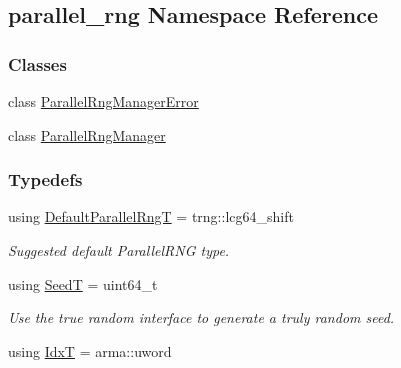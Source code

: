 \hypertarget{namespaceparallel__rng}{\subsection{parallel\-\_\-rng Namespace Reference}
\label{namespaceparallel__rng}
}
\subsubsection*{Classes}
\begin{DoxyCompactItemize}
\item 
class \hyperlink{classparallel__rng_1_1ParallelRngManagerError}{Parallel\-Rng\-Manager\-Error}
\item 
class \hyperlink{classparallel__rng_1_1ParallelRngManager}{Parallel\-Rng\-Manager}
\end{DoxyCompactItemize}
\subsubsection*{Typedefs}
\begin{DoxyCompactItemize}
\item 
using \hyperlink{namespaceparallel__rng_a4cb66b089d51a2a89cf6deac41c9b15f}{Default\-Parallel\-Rng\-T} = trng\-::lcg64\-\_\-shift
\begin{DoxyCompactList}\small\item\em Suggested default Parallel\-R\-N\-G type. \end{DoxyCompactList}\item 
using \hyperlink{namespaceparallel__rng_a462b8721a1aabe3b86582e864640c707}{Seed\-T} = uint64\-\_\-t
\begin{DoxyCompactList}\small\item\em Use the true random interface to generate a truly random seed. \end{DoxyCompactList}\item 
using \hyperlink{namespaceparallel__rng_aa22fa3e339aee5927780aac099dfc6f3}{Idx\-T} = arma\-::uword
\end{DoxyCompactItemize}
